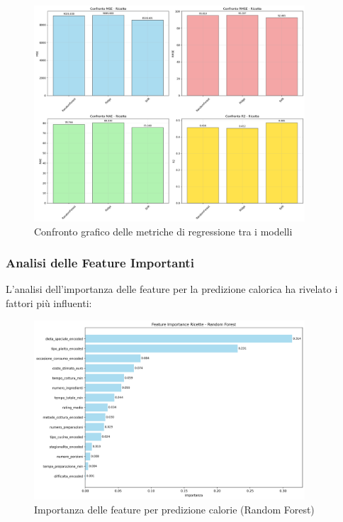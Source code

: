 \documentclass[12pt,a4paper]{article}
\begin{document}
\begin{figure}[H]
\centering
\includegraphics[width=0.9\textwidth]{dati/regression_metrics_comparison_ricette.png}
\caption{Confronto grafico delle metriche di regressione tra i modelli}
\label{fig:regression_metrics_comparison}
\end{figure}

\subsubsection{Analisi delle Feature Importanti}

L'analisi dell'importanza delle feature per la predizione calorica ha rivelato i fattori più influenti:

\begin{figure}[H]
\centering
\includegraphics[width=0.9\textwidth]{dati/feature_importance_ricette_rf.png}
\caption{Importanza delle feature per predizione calorie (Random Forest)}
\label{fig:feature_importance}
\end{figure}
\end{document}
